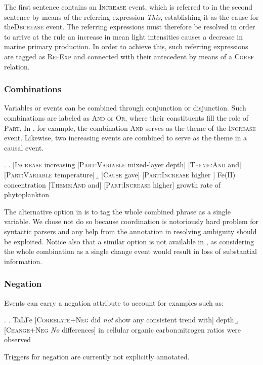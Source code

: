 \documentclass[10pt, a4paper]{article}
\newcommand{\tag}[1]{\textsc{#1}}
\begin{document}
The first sentence contains an \tag{Increase} event, which is referred to in the second sentence by means of the referring expression \emph{This}, establishing it as the cause for the\tag{Decrease} event.
The referring expressions must therefore be resolved in order to arrive at the rule an increase in mean light intensities causes a decrease in marine primary production.
In order to achieve this, such referring expressions are tagged as \tag{RefExp} and connected with their antecedent by means of a \tag{Coref} relation. 
  

\subsubsection{Combinations}

Variables or events can be combined through conjunction or disjunction.
Such combinations are labeled as \tag{And} or \tag{Or}, where their constituents fill the role of \tag{Part}.
In \Next[a], for example, the combination \tag{And} serves as the theme of the \tag{Increase} event.
Likewise, two increasing events are combined to serve as the theme in a causal event.

\exi.
  \a. [\tag{Increase} increasing [\tag{Part:Variable} mixed-layer depth] [\tag{Theme:And} and] [\tag{Part:Variable} temperature]  
  \b. [\tag{Cause} gave] [\tag{Part:Increase} higher ] Fe(II) concentration [\tag{Theme:And} and] [\tag{Part:Increase} higher] growth rate of phytoplankton

The alternative option in \Last[a] is to tag the whole combined phrase as a single variable.
We chose not do so because coordination is notoriously hard problem for syntactic parsers and any help from the annotation in resolving ambiguity should be exploited.
Notice also that a similar option is not available in \Last[b], as considering the whole combination as a single change event would result in loss of substantial information.


\subsubsection{Negation}

Events can carry a negation attribute to account for examples such as:

\exi.
  \a. TaLFe [\tag{Correlate+Neg} did \emph{not} show any consistent trend with] depth 
  \b. [\tag{Change+Neg} \emph{No} differences] in cellular organic carbon:nitrogen ratios were observed

Triggers for negation are currently not explicitly annotated.
\end{document}
